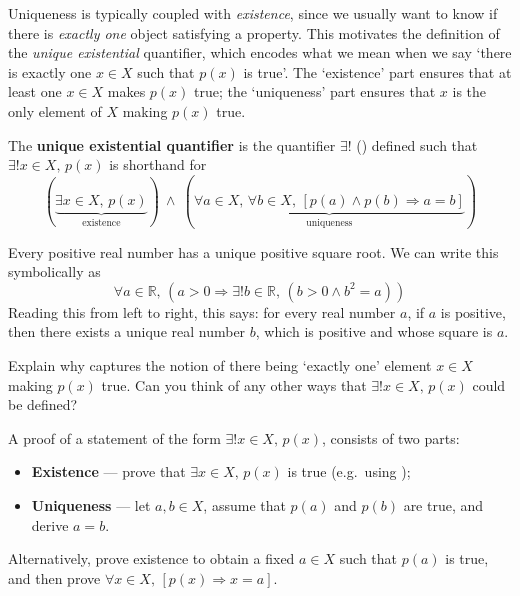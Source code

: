 Uniqueness is typically coupled with \textit{existence}, since we usually want to know if there is \textit{exactly one} object satisfying a property. This motivates the definition of the \textit{unique existential} quantifier, which encodes what we mean when we say `there is exactly one $x \in X$ such that $p(x)$ is true'. The `existence' part ensures that at least one $x \in X$ makes $p(x)$ true; the `uniqueness' part ensures that $x$ is the only element of $X$ making $p(x)$ true.

\begin{definition}
\label{defUniqueExistentialQuantifier}
The \textbf{unique existential quantifier} is the quantifier $\exists !$ (\lindexmmc{\exists!}{$\exists!$}) defined such that $\exists ! x \in X,\, p(x)$ is shorthand for
\[(\underbrace{\exists x \in X,\, p(x)}_{\text{existence}}) ~ \wedge ~ (\underbrace{\forall a \in X,\, \forall b \in X,\, [p(a) \wedge p(b) \Rightarrow a=b]}_{\text{uniqueness}})\]
\end{definition}

\begin{example}
\label{exEveryPositiveRealHasUniqueSquareRoot}
Every positive real number has a unique positive square root. We can write this symbolically as
\[\forall a \in \mathbb{R},\, (a > 0 \Rightarrow \exists ! b \in \mathbb{R},\, (b > 0 \wedge b^2=a))\]
Reading this from left to right, this says: for every real number $a$, if $a$ is positive, then there exists a unique real number $b$, which is positive and whose square is $a$. 
\end{example}

\begin{discussion}
Explain why  captures the notion of there being `exactly one' element $x \in X$ making $p(x)$ true. Can you think of any other ways that $\exists ! x \in X,\, p(x)$ could be defined?
\end{discussion}

\begin{strategy}
A proof of a statement of the form $\exists ! x \in X,\, p(x)$, consists of two parts:
\begin{itemize}
\item \textbf{Existence} --- prove that $\exists x \in X,\, p(x)$ is true (e.g.\ using );
\item \textbf{Uniqueness} --- let $a,b \in X$, assume that $p(a)$ and $p(b)$ are true, and derive $a=b$.
\end{itemize}

Alternatively, prove existence to obtain a fixed $a \in X$ such that $p(a)$ is true, and then prove $\forall x \in X,\, [p(x) \Rightarrow x=a]$.
\end{strategy}

